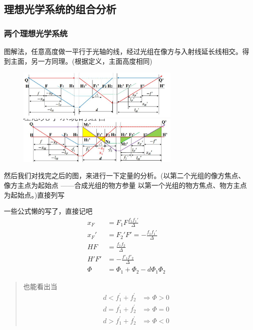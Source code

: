 \subsection{理想光学系统的组合分析}
\subsubsection{两个理想光学系统}
图解法，任意高度做一平行于光轴的线，经过光组在像方与入射线延长线相交。得到主面，另一方同理。(根据定义，主面高度相同)
        \begin{figure}[H]
            \centering
            \includegraphics[width=8cm]{img/3.8.png}
            \includegraphics[width=8cm]{img/3.9.png}
        \end{figure}
然后我们对找完之后的图，来进行一下定量的分析。(以第二个光组的像方焦点、像方主点为起始点
——合成光组的物方参量 以第一个光组的物方焦点、物方主点为起始点。)直接列写


一些公式懒的写了，直接记吧
\begin{align}
x_F&=F_1F\frac{f_1f_1'}{\Delta} \tag{2.3.7.a}\\
x_F'&=F_2'F'=-\frac{f_1f_1'}{\Delta} \tag{2.3.7.b}\\
HF&=\frac{f_1f_2}{\Delta} \tag{2.3.7.c}\\
H'F'&=-\frac{f'_1f'_2}{\Delta} \tag{2.3.7.d}\\
\Phi&=\Phi_1+\Phi_2-d\Phi_1\Phi_2 \tag{2.3.7.e}
\end{align}
\begin{quote}
{\qquad{}\ccwd\kaishu{}
也能看出当
\begin{align}
    d<f_{1}^{\prime}+f_{2}^{\prime}&\Rightarrow \Phi >0   \tag{2.3.8.a}\\
    d=f_{1}^{\prime}+f_{2}^{\prime}&\Rightarrow \Phi =0  \tag{2.3.8.b}\\
    d>f_{1}^{\prime}+f_{2}^{\prime}&\Rightarrow \Phi <0 \tag{2.3.8.c}
\end{align}
}
\end{quote}
        
